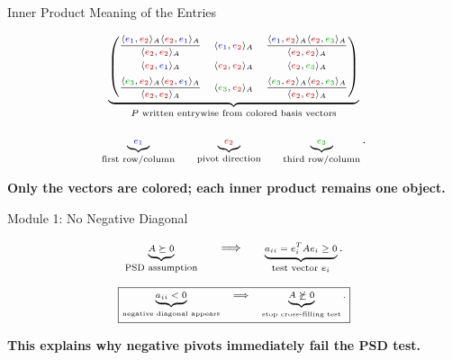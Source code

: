 \documentclass[10pt]{beamer}
\theoremstyle{definition}
\newcommand{\x}[1]{\alert{\textbf{#1}}}
\newcommand{\rd}[1]{{\color{red!70!black}#1}}
\newcommand{\bl}[1]{{\color{blue!70!black}#1}}
\newcommand{\gn}[1]{{\color{green!60!black}#1}}
\begin{document}
\begin{frame}[shrink=8]{Inner Product Meaning of the Entries}

\[
\scriptsize
\underbrace{
\begin{pmatrix}
\dfrac{\langle \bl{e_1},\rd{e_2}\rangle_A\langle \rd{e_2},\bl{e_1}\rangle_A}{\langle \rd{e_2},\rd{e_2}\rangle_A}
&
\langle \bl{e_1},\rd{e_2}\rangle_A
&
\dfrac{\langle \bl{e_1},\rd{e_2}\rangle_A\langle \rd{e_2},\gn{e_3}\rangle_A}{\langle \rd{e_2},\rd{e_2}\rangle_A}
\\[1.0em]
\langle \rd{e_2},\bl{e_1}\rangle_A
&
\langle \rd{e_2},\rd{e_2}\rangle_A
&
\langle \rd{e_2},\gn{e_3}\rangle_A
\\[0.6em]
\dfrac{\langle \gn{e_3},\rd{e_2}\rangle_A\langle \rd{e_2},\bl{e_1}\rangle_A}{\langle \rd{e_2},\rd{e_2}\rangle_A}
&
\langle \gn{e_3},\rd{e_2}\rangle_A
&
\dfrac{\langle \gn{e_3},\rd{e_2}\rangle_A\langle \rd{e_2},\gn{e_3}\rangle_A}{\langle \rd{e_2},\rd{e_2}\rangle_A}
\end{pmatrix}}_{P\text{ written entrywise from colored basis vectors}}
\]

\vfill

\[
\scriptsize
\underbrace{\bl{e_1}}_{\text{first row/column}}
\qquad
\underbrace{\rd{e_2}}_{\text{pivot direction}}
\qquad
\underbrace{\gn{e_3}}_{\text{third row/column}}.
\]

\vfill

\begin{center}
\x{Only the vectors are colored; each inner product remains one object.}
\end{center}

\end{frame}


\begin{frame}{Module 1: No Negative Diagonal}

\[
\scriptsize
\underbrace{A\succeq0}_{\text{PSD assumption}}
\qquad\Longrightarrow\qquad
\underbrace{a_{ii}=e_i^TAe_i\ge0}_{\text{test vector }e_i}.
\]

\vfill

\[
\scriptsize
\boxed{
\underbrace{a_{ii}<0}_{\text{negative diagonal appears}}
\quad\Longrightarrow\quad
\underbrace{A\not\succeq0}_{\text{stop cross-filling test}}.
}
\]

\vfill

\begin{center}
\x{This explains why negative pivots immediately fail the PSD test.}
\end{center}

\end{frame}
\end{document}
